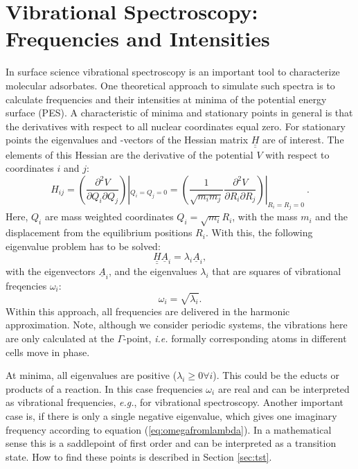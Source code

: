 \documentclass[11pt,DIV=13,BCOR=5mm,a4paper,headinclude]{scrbook}
\renewcommand{\vec}[1]{\underline{#1}}
\def\doubleunderline#1{\underline{\underline{#1}}}
\begin{document}
\section{Vibrational Spectroscopy: Frequencies and Intensities}\label{sec:freq_theo}
In surface science vibrational spectroscopy is an important tool to characterize molecular adsorbates.
One theoretical approach to simulate such spectra is to calculate frequencies and their intensities at minima of the potential energy surface (PES).
A characteristic of minima and stationary points in general is that the derivatives with respect to all nuclear coordinates equal zero.
For stationary points the eigenvalues and -vectors of the Hessian matrix $\doubleunderline{H}$ are of interest.
The elements of this Hessian are the derivative of the potential $V$ with respect to coordinates $i$ and $j$:
\begin{equation}
 H_{ij}=\left( \frac{\partial^2 V}{\partial Q_i \partial Q_j} \right)|_{Q_i=Q_j=0}=\left(\frac{1}{\sqrt{m_i m_j}} \frac{\partial^2 V}{\partial R_i \partial R_j} \right)|_{R_i=R_j=0} ~.
\end{equation}
Here, $Q_i$ are mass weighted coordinates $Q_i=\sqrt{m_i}R_i$, with the mass $m_i$ and the displacement from the equilibrium positions $R_i$.
With this, the following eigenvalue problem has to be solved:
\begin{equation}
 \doubleunderline{H} \vec{A}_i=\lambda_i\vec{A}_i,
\end{equation}
with the eigenvectors $\vec{A}_i$, and the eigenvalues $\lambda_i$ that are squares of vibrational freqencies $\omega_i$: 
\begin{equation}\label{eq:omegafromlambda}
 \omega_i=\sqrt{\lambda_i}.
\end{equation}
Within this approach, all frequencies are delivered in the harmonic approximation.
Note, although we consider periodic systems, the vibrations here are only calculated at the $\Gamma$-point, \textit{i.e.} formally corresponding atoms in different cells move in phase.


At minima, all eigenvalues are positive ($\lambda_i\geq 0 \forall i$).
This could be the educts or products of a reaction.
In this case frequencies $\omega_i$ are real and can be interpreted as vibrational frequencies, \textit{e.g.}, for vibrational spectroscopy.
Another important case is, if there is only a single negative eigenvalue, which gives one imaginary frequency according to equation (\ref{eq:omegafromlambda}).
In a mathematical sense this is a saddlepoint of first order and can be interpreted as a transition state.
How to find these points is described in Section \ref{sec:tst}.
\\\\
\end{document}
